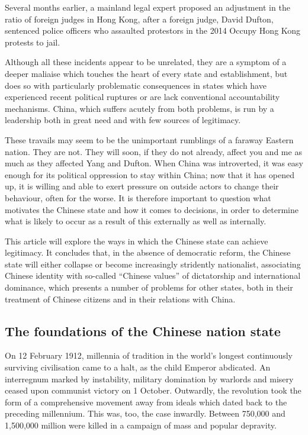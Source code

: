 \documentclass[10pt,a4paper,twocolumn]{article}
\newcounter{count}
\begin{document}
Several months earlier, a mainland legal expert proposed an adjustment in the ratio of foreign judges in Hong Kong, after a foreign judge, David Dufton, sentenced police officers who assaulted protestors in the 2014 Occupy Hong Kong protests to jail.

Although all these incidents appear to be unrelated, they are a symptom of a deeper maliaise which touches the heart of every state and establishment, but does so with particularly problematic consequences in states which have experienced recent political ruptures or are lack conventional accountability mechanisms. China, which suffers acutely from both problems, is run by a leadership both in great need and with few sources of legitimacy.

These travails may seem to be the unimportant rumblings of a faraway Eastern nation. They are not. They will soon, if they do not already, affect you and me as much as they affected Yang and Dufton. When China was introverted, it was easy enough for its political oppression to stay within China; now that it has opened up, it is willing and able to exert pressure on outside actors to change their behaviour, often for the worse. It is therefore important to question what motivates the Chinese state and how it comes to decisions, in order to determine what is likely to occur as a result of this externally as well as internally.

This article will explore the ways in which the Chinese state can achieve legitimacy. It concludes that, in the absence of democratic reform, the Chinese state will either collapse or become increasingly stridently nationalist, associating Chinese identity with so-called ``Chinese values'' of dictatorship and international dominance, which presents a number of problems for other states, both in their treatment of Chinese citizens and in their relations with China.

\subsection{The foundations of the Chinese nation state}

On 12 February 1912, millennia of tradition in the world’s longest continuously surviving civilisation came to a halt, as the child Emperor abdicated. An interregnum marked by instability, military domination by warlords and misery ceased upon communist victory on 1 October. Outwardly, the revolution took the form of a comprehensive movement away from ideals which dated back to the preceding millennium. This was, too, the case inwardly. Between 750,000 and 1,500,000 million were killed in a campaign of mass and popular depravity.
\end{document}
